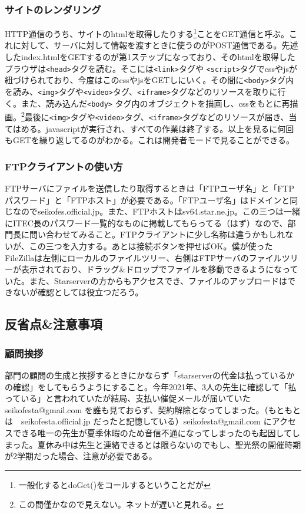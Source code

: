 \documentclass[dvipdfmx,jb5]{jarticle}
\begin{document}
\subsubsection{サイトのレンダリング}
HTTP通信のうち、サイトのhtmlを取得したりする\footnote{一般化するとdoGet()をコールするということだが}ことをGET通信と呼ぶ。これに対して、サーバに対して情報を渡すときに使うのがPOST通信である。先述したindex.htmlをGETするのが第1ステップになっており、そのhtmlを取得したブラウザは\verb|<head>|タグを読む。そこには\verb|<link>|タグや \verb|<script>|タグでcssやjsが紐づけられており、今度はこのcssやjsをGETしにいく。その間に\verb|<body>|タグ内を読み、\verb|<img>|タグや\verb|<video>|タグ、\verb|<iframe>|タグなどのリソースを取りに行く。また、読み込んだ\verb|<body>| タグ内のオブジェクトを描画し、cssをもとに再描画。\footnote{この間僅かなので見えない。ネットが遅いと見れる。}最後に\verb|<img>|タグや\verb|<video>|タグ、\verb|<iframe>|タグなどのリソースが届き、当てはめる。javascriptが実行され、すべての作業は終了する。以上を見るに何回もGETを繰り返してるのがわかる。これは開発者モードで見ることができる。
\subsubsection{FTPクライアントの使い方}
FTPサーバにファイルを送信したり取得するときは「FTPユーザ名」と「FTPパスワード」と「FTPホスト」が必要である。「FTPユーザ名」はドメインと同じなのでseikofes.official.jp。また、FTPホストはsv64.star.ne.jp。この三つは一緒にITEC長のパスワード一覧的なものに掲載してもらってる（はず）なので、部門長に問い合わせてみること。FTPクライアントに少し名称は違うかもしれないが、この三つを入力する。あとは接続ボタンを押せばOK。僕が使ったFileZillaは左側にローカルのファイルツリー、右側はFTPサーバのファイルツリーが表示されており、ドラッグ\&ドロップでファイルを移動できるようになっていた。また、Starserverの方からもアクセスでき、ファイルのアップロードはできないが確認としては役立つだろう。
 \subsection{反省点\&注意事項}
 \subsubsection{顧問挨拶}
 部門の顧問の生成と挨拶するときにかならず「starserverの代金は払っているかの確認」をしてもらうようにすること。今年2021年、3人の先生に確認して「払っている」と言われていたが結局、支払い催促メールが届いていた seikofesta@gmail.com を誰も見ておらず、契約解除となってしまった。（もともとは　seikofesta.official.jp だったと記憶している）seikofesta@gmail.com にアクセスできる唯一の先生が夏季休暇のため音信不通になってしまったのも起因してしまった。夏休み中は先生と連絡できるとは限らないのでもし、聖光祭の開催時期が2学期だった場合、注意が必要である。
\end{document}
